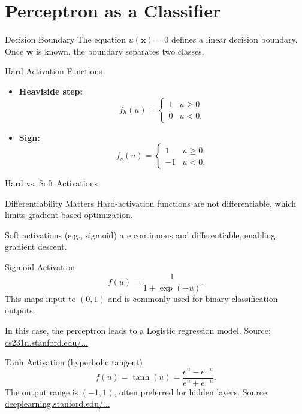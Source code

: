 \documentclass[10pt]{beamer}
\begin{document}
\section{Perceptron as a Classifier}

\begin{frame}{Decision Boundary}
  \justifying
  The equation $u(\bm{x})=0$ defines a linear decision boundary.
  Once $\bm{w}$ is known, the boundary separates two classes.
\end{frame}

\begin{frame}{Hard Activation Functions}
  \justifying
  \begin{itemize}
    \item \textbf{Heaviside step:}
      \[
        f_h(u) = \begin{cases} 1 & u \ge 0, \\ 0 & u < 0. \end{cases}
      \]
    \item \textbf{Sign:}
      \[
        f_s(u) = \begin{cases} 1 & u \ge 0, \\ -1 & u < 0. \end{cases}
      \]
  \end{itemize}
\end{frame}

\begin{frame}{Hard vs. Soft Activations}
  \justifying
  \begin{warningbox}{Differentiability Matters}
    Hard-activation functions are not differentiable, which limits gradient-based optimization.
  \end{warningbox}
  Soft activations (e.g., sigmoid) are continuous and differentiable, enabling gradient descent.
\end{frame}

\begin{frame}{Sigmoid Activation}
  \justifying
  \[
    f(u) = \frac{1}{1 + \exp(-u)}.
  \]
  This maps input to $(0,1)$ and is commonly used for binary classification outputs.

  In this case, the perceptron leads to a Logistic regression model. 
  \vspace{0.5em}
  \footnotesize
  Source: \href{https://cs231n.stanford.edu/slides/2024/lecture_6_part_2.pdf}{cs231n.stanford.edu/...}
\end{frame}

\begin{frame}{Tanh Activation (hyperbolic tangent)}
  \justifying
  \[
    f(u) = \tanh(u) = \frac{e^u - e^{-u}}{e^u + e^{-u}}.
  \]
  The output range is $(-1,1)$, often preferred for hidden layers.
  \vspace{0.5em}
  \footnotesize
  Source: \href{http://deeplearning.stanford.edu/tutorial/supervised/MultiLayerNeuralNetworks/}{deeplearning.stanford.edu/...}
\end{frame}
\end{document}
